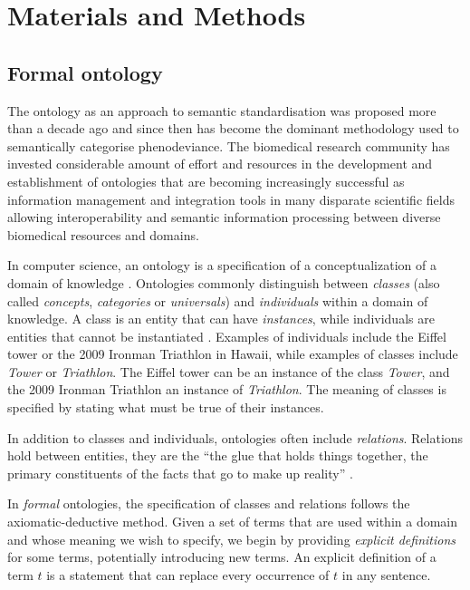 \documentclass{bioinfo}
\renewcommand{\cite}{\citep}
\begin{document}
\section{Materials and Methods}
\subsection{Formal ontology}
The ontology as an approach to semantic standardisation was proposed
more than a decade ago and since then has become the dominant
methodology used to semantically categorise phenodeviance.  The
biomedical research community has invested considerable amount of
effort and resources in the development and establishment of
ontologies that are becoming increasingly successful as information
management and integration tools in many disparate scientific fields
allowing interoperability and semantic information processing between
diverse biomedical resources and domains.

In computer science, an ontology is a specification of a
conceptualization of a domain of knowledge \cite{Gruber1995,
  Guarino1998}.  Ontologies commonly distinguish between {\em classes}
(also called {\em concepts}, {\em categories} or {\em universals}) and
{\em individuals} within a domain of knowledge. A class is an entity
that can have {\em instances}, while individuals are entities that
cannot be instantiated \cite{Herre2006}. Examples of individuals
include the Eiffel tower or the 2009 Ironman Triathlon in Hawaii,
while examples of classes include {\em Tower} or {\em Triathlon}. The
Eiffel tower can be an instance of the class {\em Tower}, and the 2009
Ironman Triathlon an instance of {\em Triathlon}.  The meaning of
classes is specified by stating what must be true of their instances.

In addition to classes and individuals, ontologies often include {\em
  relations}. Relations hold between entities, they are the ``the glue
that holds things together, the primary constituents of the facts that
go to make up reality'' \cite{Barwise1989}.

In {\em formal} ontologies, the specification of classes and relations
follows the axiomatic-deductive method. Given a set of terms that are
used within a domain and whose meaning we wish to specify, we begin by
providing {\em explicit definitions} for some terms, potentially
introducing new terms. An explicit definition of a term $t$ is a
statement that can replace every occurrence of $t$ in any sentence.
\end{document}

